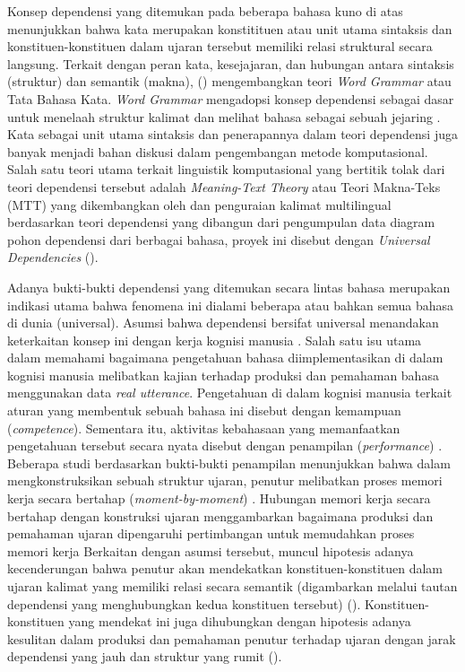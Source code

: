 Konsep dependensi yang ditemukan pada beberapa bahasa kuno di atas menunjukkan bahwa kata merupakan konstitituen atau unit utama sintaksis dan konstituen-konstituen dalam ujaran tersebut memiliki relasi struktural secara langsung. Terkait dengan peran kata, kesejajaran, dan hubungan antara sintaksis (struktur) dan semantik (makna), (\citealp{hudson1984word, hudson2007language}) mengembangkan teori \textit{Word Grammar} atau Tata Bahasa Kata. \textit{Word Grammar} mengadopsi konsep dependensi sebagai dasar untuk menelaah struktur kalimat dan melihat bahasa sebagai sebuah jejaring \citep{hudson2007language}. Kata sebagai unit utama sintaksis dan penerapannya dalam teori dependensi juga banyak menjadi bahan diskusi dalam pengembangan metode komputasional. Salah satu teori utama terkait linguistik komputasional yang bertitik tolak dari teori dependensi tersebut adalah \textit{Meaning-Text Theory} atau Teori Makna-Teks (MTT) yang dikembangkan oleh \cite{mel'vcuk1988dependency} dan penguraian kalimat multilingual berdasarkan teori dependensi yang dibangun dari pengumpulan data diagram pohon dependensi dari berbagai bahasa, proyek ini disebut dengan \textit{Universal Dependencies} (\citealp{mcdonald2013universal, nivre2016universal, nivre2017universal}). 

Adanya bukti-bukti dependensi yang ditemukan secara lintas bahasa merupakan indikasi utama bahwa fenomena ini dialami beberapa atau bahkan semua bahasa di dunia (universal). Asumsi bahwa dependensi bersifat universal menandakan keterkaitan konsep ini dengan kerja kognisi manusia \citep{gibson2000dependency}. Salah satu isu utama dalam memahami bagaimana pengetahuan bahasa diimplementasikan di dalam kognisi manusia melibatkan kajian terhadap produksi dan pemahaman bahasa menggunakan data \textit{real utterance}. Pengetahuan di dalam kognisi manusia terkait aturan yang membentuk sebuah bahasa ini disebut dengan kemampuan (\textit{competence}). Sementara itu, aktivitas kebahasaan yang memanfaatkan pengetahuan tersebut secara nyata disebut dengan penampilan (\textit{performance}) \citep{delahuntygarvey2010soundsense}. Beberapa studi berdasarkan bukti-bukti penampilan menunjukkan bahwa dalam mengkonstruksikan sebuah struktur ujaran, penutur melibatkan proses memori kerja secara bertahap (\textit{moment-by-moment}) \citep{gibson2000dependency}. Hubungan memori kerja secara bertahap dengan konstruksi ujaran menggambarkan bagaimana produksi dan pemahaman ujaran dipengaruhi pertimbangan untuk memudahkan proses memori kerja \citep{futrell2015large} Berkaitan dengan asumsi tersebut, muncul hipotesis adanya kecenderungan bahwa penutur akan mendekatkan konstituen-konstituen dalam ujaran kalimat yang memiliki relasi secara semantik (digambarkan melalui tautan dependensi yang menghubungkan kedua konstituen tersebut) (\citealp{futrell2015large, liu2017dependency}). Konstituen-konstituen yang mendekat ini juga dihubungkan dengan hipotesis adanya kesulitan dalam produksi dan pemahaman penutur terhadap ujaran dengan jarak dependensi yang jauh dan struktur yang rumit (\citealp{gibson2000dependency, dillon2011structured}).

